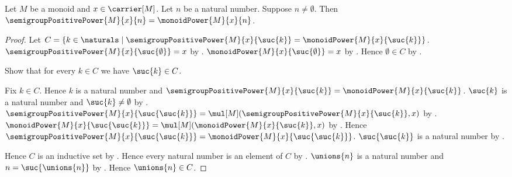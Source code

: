 \begin{theorem}\label{semigroup_positive_power_eq_monoid_power}
    Let $M$ be a monoid and $x\in\carrier[M]$.
    Let $n$ be a natural number.
    Suppose $n\neq\emptyset$.
    Then $\semigroupPositivePower{M}{x}{n}=\monoidPower{M}{x}{n}$.
\end{theorem}
\begin{proof}
    Let $C=\{k\in\naturals\mid
        \text{$\semigroupPositivePower{M}{x}{\suc{k}}
            =\monoidPower{M}{x}{\suc{k}}$}\}$.
    $\semigroupPositivePower{M}{x}{\suc{\emptyset}}=x$ by
        .
    $\monoidPower{M}{x}{\suc{\emptyset}}=x$ by
        .
    Hence $\emptyset\in C$ by .

    Show that for every $k\in C$ we have $\suc{k}\in C$.
    \begin{subproof}
        Fix $k\in C$.
        Hence $k$ is a natural number and
            $\semigroupPositivePower{M}{x}{\suc{k}}
                =\monoidPower{M}{x}{\suc{k}}$.
        $\suc{k}$ is a natural number and $\suc{k}\neq\emptyset$ by
            .
        $\semigroupPositivePower{M}{x}{\suc{\suc{k}}}
            =\mul[M](\semigroupPositivePower{M}{x}{\suc{k}},x)$ by
            .
        $\monoidPower{M}{x}{\suc{\suc{k}}}
            =\mul[M](\monoidPower{M}{x}{\suc{k}},x)$ by
            .
        Hence $\semigroupPositivePower{M}{x}{\suc{\suc{k}}}
            =\monoidPower{M}{x}{\suc{\suc{k}}}$.
        $\suc{\suc{k}}$ is a natural number by
            .
    \end{subproof}
    Hence $C$ is an inductive set by .
    Hence every natural number is an element of $C$ by
        .
    $\unions{n}$ is a natural number and
        $n=\suc{\unions{n}}$ by
        .
    Hence $\unions{n}\in C$.
\end{proof}

